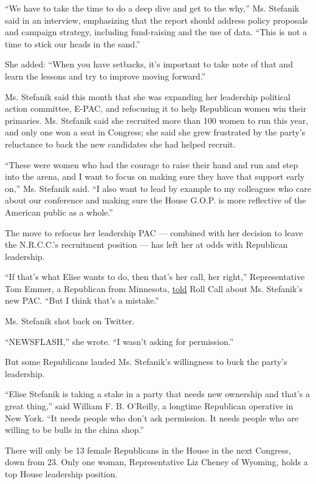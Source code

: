 ``We have to take the time to do a deep dive and get to the why,'' Ms.
Stefanik said in an interview, emphasizing that the report should
address policy proposals and campaign strategy, including fund-raising
and the use of data. ``This is not a time to stick our heads in the
sand.''

She added: ``When you have setbacks, it's important to take note of that
and learn the lessons and try to improve moving forward.''

Ms. Stefanik said this month that she was expanding her leadership
political action committee, E-PAC, and refocusing it to help Republican
women win their primaries. Ms. Stefanik said she recruited more than 100
women to run this year, and only one won a seat in Congress; she said
she grew frustrated by the party's reluctance to back the new candidates
she had helped recruit.

``These were women who had the courage to raise their hand and run and
step into the arena, and I want to focus on making sure they have that
support early on,'' Ms. Stefanik said. ``I also want to lead by example
to my colleagues who care about our conference and making sure the House
G.O.P. is more reflective of the American public as a whole.''

The move to refocus her leadership PAC --- combined with her decision to
leave the N.R.C.C.'s recruitment position --- has left her at odds with
Republican leadership.

``If that's what Elise wants to do, then that's her call, her right,''
Representative Tom Emmer, a Republican from Minnesota,
\href{https://www.rollcall.com/news/politics/elise-stefanik-wants-to-play-in-primaries-to-help-republican-women}{told}
Roll Call about Ms. Stefanik's new PAC. ``But I think that's a
mistake.''

Ms. Stefanik shot back on Twitter.

``NEWSFLASH,'' she wrote. ``I wasn't asking for permission.''

But some Republicans lauded Ms. Stefanik's willingness to buck the
party's leadership.

``Elise Stefanik is taking a stake in a party that needs new ownership
and that's a great thing,'' said William F. B. O'Reilly, a longtime
Republican operative in New York. ``It needs people who don't ask
permission. It needs people who are willing to be bulls in the china
shop.''

There will only be 13 female Republicans in the House in the next
Congress, down from 23. Only one woman, Representative Liz Cheney of
Wyoming, holds a top House leadership position.

